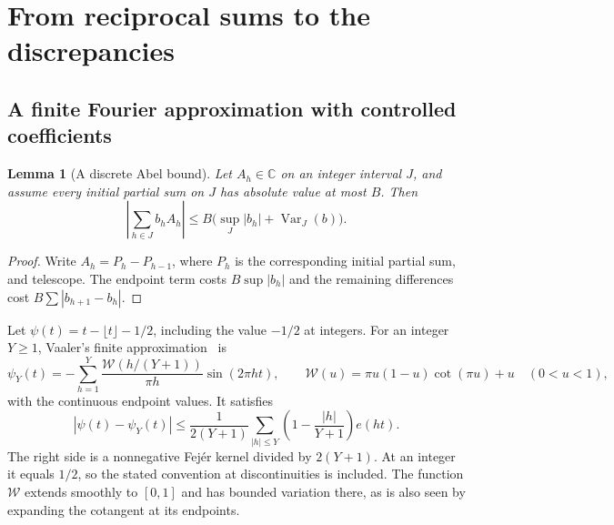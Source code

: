 \documentclass[11pt,reqno]{amsart}
\numberwithin{equation}{section}
\newtheorem{lemma}[lemma]{Lemma}
\theoremstyle{definition}
\theoremstyle{remark}
\newcommand{\Var}{\operatorname{Var}}
\begin{document}
\section{From reciprocal sums to the discrepancies}\label{sec:reduction}
\subsection{A finite Fourier approximation with controlled coefficients}
\begin{lemma}[A discrete Abel bound]\label{lem:Abel}
Let $A_h\in\mathbb C$ on an integer interval $J$, and assume every initial partial sum on $J$ has absolute value at most $B$. Then
\[
 \left|\sum_{h\in J}b_hA_h\right|
 \le B\bigl(\sup_J|b_h|+\Var_J(b)\bigr).
\]
\end{lemma}
\begin{proof}
Write $A_h=P_h-P_{h-1}$, where $P_h$ is the corresponding initial partial sum, and telescope. The endpoint term costs $B\sup|b_h|$ and the remaining differences cost $B\sum|b_{h+1}-b_h|$.
\end{proof}


Let $\psi(t)=t-\lfloor t\rfloor-1/2$, including the value $-1/2$ at integers.
For an integer $Y\ge1$, Vaaler's finite approximation~\cite{Vaaler} is
\begin{equation}\label{eq:Vaaler}
 \psi_Y(t)=-\sum_{h=1}^Y\frac{\mathcal W(h/(Y+1))}{\pi h}\sin(2\pi ht),
 \qquad
 \mathcal W(u)=\pi u(1-u)\cot(\pi u)+u\quad(0<u<1),
\end{equation}
with the continuous endpoint values.
It satisfies
\begin{equation}\label{eq:Fejer}
 |\psi(t)-\psi_Y(t)|\le\frac1{2(Y+1)}
 \sum_{|h|\le Y}\left(1-\frac{|h|}{Y+1}\right)e(ht).
\end{equation}
The right side is a nonnegative Fej\'er kernel divided by $2(Y+1)$.
At an integer it equals $1/2$, so the stated convention at discontinuities is included.
The function $\mathcal W$ extends smoothly to $[0,1]$ and has bounded variation there, as is also seen by expanding the cotangent at its endpoints.
\end{document}
